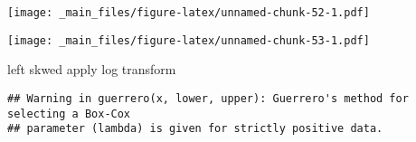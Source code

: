 \documentclass[
]{book}
\newenvironment{Shaded}{\begin{snugshade}}{\end{snugshade}}
\newcommand{\AttributeTok}[1]{\textcolor[rgb]{0.77,0.63,0.00}{#1}}
\newcommand{\FunctionTok}[1]{\textcolor[rgb]{0.00,0.00,0.00}{#1}}
\newcommand{\NormalTok}[1]{#1}
\newcommand{\OtherTok}[1]{\textcolor[rgb]{0.56,0.35,0.01}{#1}}
\newcommand{\SpecialCharTok}[1]{\textcolor[rgb]{0.00,0.00,0.00}{#1}}
\newcommand{\StringTok}[1]{\textcolor[rgb]{0.31,0.60,0.02}{#1}}
\begin{document}
\begin{Shaded}
\end{Shaded}

\texttt{[image: \_main\_files/figure-latex/unnamed-chunk-52-1.pdf]}

\begin{Shaded}
\end{Shaded}

\texttt{[image: \_main\_files/figure-latex/unnamed-chunk-53-1.pdf]}

left skwed apply log transform

\begin{Shaded}
\end{Shaded}

\begin{verbatim}
## Warning in guerrero(x, lower, upper): Guerrero's method for selecting a Box-Cox
## parameter (lambda) is given for strictly positive data.
\end{verbatim}
\end{document}
